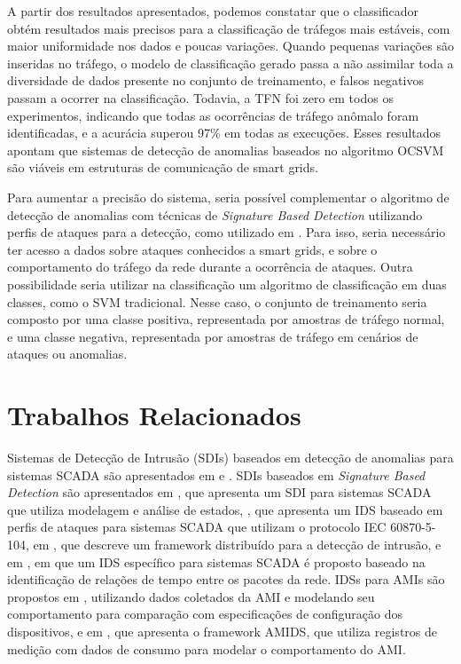 \documentclass[12pt]{article}
\begin{document}
A partir dos resultados apresentados, podemos constatar que o classificador obtém resultados mais precisos para a classificação de tráfegos mais estáveis, com maior uniformidade nos dados e poucas variações. Quando pequenas variações são inseridas no tráfego, o modelo de classificação gerado passa a não assimilar toda a diversidade de dados presente no conjunto de treinamento, e falsos negativos passam a ocorrer na classificação. Todavia, a TFN foi zero em todos os experimentos, indicando que todas as ocorrências de tráfego anômalo foram identificadas, e a acurácia superou 97\% em todas as execuções. Esses resultados apontam que sistemas de detecção de anomalias baseados no algoritmo OCSVM são viáveis em estruturas de comunicação de smart grids.

Para aumentar a precisão do sistema, seria possível complementar o algoritmo de detecção de anomalias com técnicas de \emph{Signature Based Detection} utilizando perfis de ataques para a detecção, como utilizado em \cite{yang2013iecdetection}. Para isso, seria necessário ter acesso a dados sobre ataques conhecidos a smart grids, e sobre o comportamento do tráfego da rede durante a ocorrência de ataques. Outra possibilidade seria utilizar na classificação um algoritmo de classificação em duas classes, como o SVM tradicional. Nesse caso, o conjunto de treinamento seria composto por uma classe positiva, representada por amostras de tráfego normal, e uma classe negativa, representada por amostras de tráfego em cenários de ataques ou anomalias.

\section{Trabalhos Relacionados}
\label{related}
Sistemas de Detecção de Intrusão (SDIs) baseados em detecção de anomalias para sistemas SCADA são apresentados em \cite{coutinho2009anomaly} e \cite{tsang2005multi}.
SDIs baseados em \emph{Signature Based Detection} são apresentados em \cite{carcano2011multidim}, que apresenta um SDI para sistemas SCADA que utiliza modelagem e análise de estados, \cite{yang2013iecdetection}, que apresenta um IDS baseado em perfis de ataques para sistemas SCADA que utilizam o protocolo IEC 60870-5-104, em \cite{2014multiattribute}, que descreve um framework distribuído para a detecção de intrusão, e em \cite{2014temporalintrusion}, em que um IDS específico para sistemas SCADA é proposto baseado na identificação de relações de tempo entre os pacotes da rede.
IDSs para AMIs são propostos em \cite{aliprobabilistic}, utilizando dados coletados da AMI e modelando seu comportamento para comparação com especificações de configuração dos dispositivos, e em \cite{mclaughlinamids}, que apresenta o framework AMIDS, que utiliza registros de medição com dados de consumo para modelar o comportamento do AMI.
\end{document}
